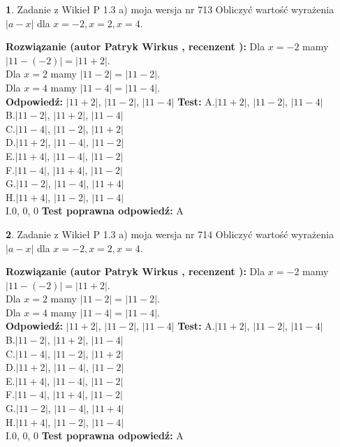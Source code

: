 \documentclass[12pt, a4paper]{article}
\theoremstyle{definition} %
\newtheorem{zad}{}
\newcommand{\zadStart}[1]{\begin{zad}#1\newline}
\newcommand{\zadStop}{\end{zad}}
\newcommand{\rozwStart}[2]{\noindent \textbf{Rozwiązanie (autor #1 , recenzent #2): }\newline}
\newcommand{\rozwStop}{\newline}
\newcommand{\odpStart}{\noindent \textbf{Odpowiedź:}\newline}
\newcommand{\odpStop}{\newline}
\newcommand{\testStart}{\noindent \textbf{Test:}\newline}
\newcommand{\testStop}{\newline}
\newcommand{\kluczStart}{\noindent \textbf{Test poprawna odpowiedź:}\newline}
\newcommand{\kluczStop}{\newline}
\begin{document}
\zadStart{Zadanie z Wikieł P 1.3 a) moja wersja nr 713}
Obliczyć wartość wyrażenia $|a - x|$ dla $x=-2,x=2,x=4$.
\zadStop
\rozwStart{Patryk Wirkus}{}
Dla $x = -2$ mamy $|11 - (-2)| = |11 + 2|$.\\
Dla $x = 2$ mamy $|11 - 2| = |11 - 2|$.\\
Dla $x = 4$ mamy $|11 - 4| = |11 - 4|$.\\
\rozwStop
\odpStart
$|11 + 2|$, $|11 - 2|$, $|11 - 4|$
\odpStop
\testStart
A.$|11 + 2|$, $|11 - 2|$, $|11 - 4|$\\
B.$|11 - 2|$, $|11 + 2|$, $|11 - 4|$\\
C.$|11 - 4|$, $|11 - 2|$, $|11 + 2|$\\
D.$|11 + 2|$, $|11 - 4|$, $|11 - 2|$\\
E.$|11 + 4|$, $|11 - 4|$, $|11 - 2|$\\
F.$|11 - 4|$, $|11 + 4|$, $|11 - 2|$\\
G.$|11 - 2|$, $|11 - 4|$, $|11 + 4|$\\
H.$|11 + 4|$, $|11 - 2|$, $|11 - 4|$\\
I.$0$, $0$, $0$
\testStop
\kluczStart
A
\kluczStop



\zadStart{Zadanie z Wikieł P 1.3 a) moja wersja nr 714}
Obliczyć wartość wyrażenia $|a - x|$ dla $x=-2,x=2,x=4$.
\zadStop
\rozwStart{Patryk Wirkus}{}
Dla $x = -2$ mamy $|11 - (-2)| = |11 + 2|$.\\
Dla $x = 2$ mamy $|11 - 2| = |11 - 2|$.\\
Dla $x = 4$ mamy $|11 - 4| = |11 - 4|$.\\
\rozwStop
\odpStart
$|11 + 2|$, $|11 - 2|$, $|11 - 4|$
\odpStop
\testStart
A.$|11 + 2|$, $|11 - 2|$, $|11 - 4|$\\
B.$|11 - 2|$, $|11 + 2|$, $|11 - 4|$\\
C.$|11 - 4|$, $|11 - 2|$, $|11 + 2|$\\
D.$|11 + 2|$, $|11 - 4|$, $|11 - 2|$\\
E.$|11 + 4|$, $|11 - 4|$, $|11 - 2|$\\
F.$|11 - 4|$, $|11 + 4|$, $|11 - 2|$\\
G.$|11 - 2|$, $|11 - 4|$, $|11 + 4|$\\
H.$|11 + 4|$, $|11 - 2|$, $|11 - 4|$\\
I.$0$, $0$, $0$
\testStop
\kluczStart
A
\kluczStop
\end{document}

